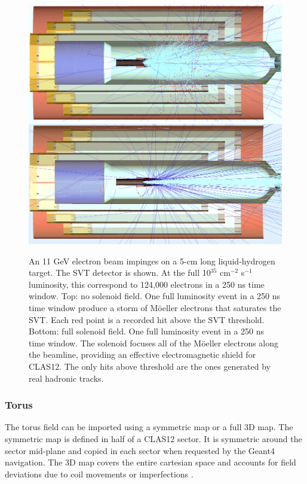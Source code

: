 \begin{figure}
	\centering
	\includegraphics[width=0.98\columnwidth,keepaspectratio]{img/solenoidOFF.png}
	\includegraphics[width=0.98\columnwidth,keepaspectratio]{img/solenoidON.png}
    \caption{An 11 GeV electron beam impinges on a 5-cm long liquid-hydrogen target. The SVT detector is shown.
             At the full 10$^{35}$ cm$^{-2}$ s$^{-1}$ luminosity, this correspond to 124,000 electrons in a 250 ns time window.
			 Top: no solenoid field. One full luminosity event in a 250 ns time window produce a storm of M\"oeller electrons that
             saturates the SVT. Each red point is a recorded hit above the SVT threshold.
			 Bottom: full solenoid field. One full luminosity event in a 250 ns time window.
             The solenoid focuses all of the M\"oeller electrons along the beamline, providing an effective electromagnetic shield for CLAS12.
			 The only hits above threshold are the ones generated by real hadronic tracks. }
	\label{fig:solenoidONOFF}
\end{figure}

\subsubsection{Torus}
The torus field can be imported using a symmetric map or a full 3D map.
The symmetric map is defined in half of a CLAS12 sector. It is symmetric around the sector mid-plane and copied in each sector
when requested by the Geant4 navigation. The 3D map covers the entire cartesian space and accounts for field deviations due to coil
movements or imperfections \cite{GhoshalSolenoid}.

